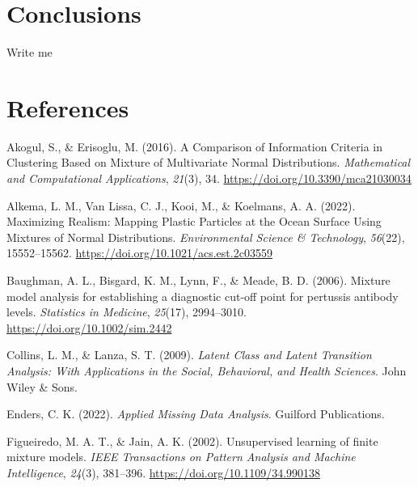 \documentclass[
  ,man,floatsintext]{apa6}
\newlength{\cslhangindent}
\newlength{\cslentryspacingunit} %
\newenvironment{CSLReferences}[2] %
 {%
  \setlength{\parindent}{0pt}
  \ifodd #1
  \let\oldpar\par
  \def\par{\hangindent=\cslhangindent\oldpar}
  \fi
  \setlength{\parskip}{#2\cslentryspacingunit}
 }%
 {}
\begin{document}
\hypertarget{conclusions}{%
\section{Conclusions}\label{conclusions}}

Write me

\newpage

\hypertarget{references}{%
\section*{References}\label{references}}

\hypertarget{refs}{}
\begin{CSLReferences}{1}{0}
\leavevmode{}%
Akogul, S., \& Erisoglu, M. (2016). A {Comparison} of {Information} {Criteria} in {Clustering} {Based} on {Mixture} of {Multivariate} {Normal} {Distributions}. \emph{Mathematical and Computational Applications}, \emph{21}(3), 34. \url{https://doi.org/10.3390/mca21030034}

\leavevmode{}%
Alkema, L. M., Van Lissa, C. J., Kooi, M., \& Koelmans, A. A. (2022). Maximizing {Realism}: {Mapping} {Plastic} {Particles} at the {Ocean} {Surface} {Using} {Mixtures} of {Normal} {Distributions}. \emph{Environmental Science \& Technology}, \emph{56}(22), 15552--15562. \url{https://doi.org/10.1021/acs.est.2c03559}

\leavevmode{}%
Baughman, A. L., Bisgard, K. M., Lynn, F., \& Meade, B. D. (2006). Mixture model analysis for establishing a diagnostic cut-off point for pertussis antibody levels. \emph{Statistics in Medicine}, \emph{25}(17), 2994--3010. \url{https://doi.org/10.1002/sim.2442}

\leavevmode{}%
Collins, L. M., \& Lanza, S. T. (2009). \emph{Latent {Class} and {Latent} {Transition} {Analysis}: {With} {Applications} in the {Social}, {Behavioral}, and {Health} {Sciences}}. John Wiley \& Sons.

\leavevmode{}%
Enders, C. K. (2022). \emph{Applied {Missing} {Data} {Analysis}}. Guilford Publications.

\leavevmode{}%
Figueiredo, M. A. T., \& Jain, A. K. (2002). Unsupervised learning of finite mixture models. \emph{IEEE Transactions on Pattern Analysis and Machine Intelligence}, \emph{24}(3), 381--396. \url{https://doi.org/10.1109/34.990138}


\end{CSLReferences}
\end{document}
